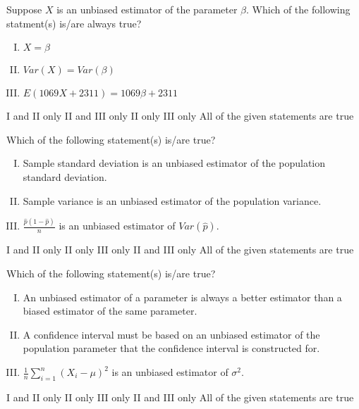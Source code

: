 \documentclass[letterpaper,10pt,addpoints]{exam}
\begin{document}
\begin{questions}

\question Suppose $X$ is an unbiased estimator of the parameter $\beta$. Which of the following statment(s) is/are always true?
\begin{enumerate}[I.]
  \item $X = \beta$
  \item $Var(X) = Var(\beta)$
  \item $E(1069X+2311) = 1069\beta+2311$
\end{enumerate}
\begin{choices}
  \choice I and II only
  \choice II and III only
  \choice II only
  \correctchoice III only
  \choice All of the given statements are true
  \end{choices}


\question Which of the following statement(s) is/are true?
\begin{enumerate}[I.]
  \item Sample standard deviation is an unbiased estimator of the population standard deviation.
  \item Sample variance is an unbiased estimator of the population variance.
  \item $\frac{\hat{p}(1-\hat{p})}{n}$ is an unbiased estimator of $Var(\hat{p})$.
\end{enumerate}
\begin{choices}
  \choice I and II only
  \correctchoice II only
  \choice III only
  \choice II and III only
  \choice All of the given statements are true
  \end{choices}

\question Which of the following statement(s) is/are true?
\begin{enumerate}[I.]
  \item An unbiased estimator of a parameter is always a better estimator than a biased estimator of the same parameter.
  \item A confidence interval must be based on an unbiased estimator of the population parameter that the confidence interval is constructed for.
  \item $\frac{1}{n}\sum_{i=1}^n(X_i - \mu)^2$ is an unbiased estimator of $\sigma^2$.
\end{enumerate}
\begin{choices}
  \choice I and II only
  \choice II only
  \correctchoice III only
  \choice II and III only
  \choice All of the given statements are true
  \end{choices}


\end{questions}
\end{document}
